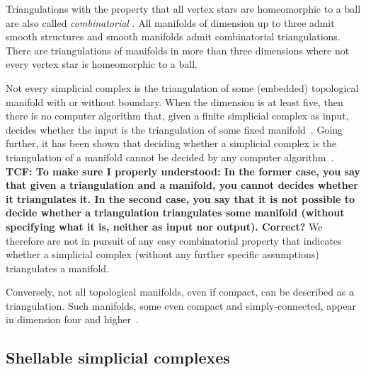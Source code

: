 \documentclass[10pt,a4paper]{article}
\newcommand{\todo}[1]{{\color{RedOrange}\textbf{#1}}}
\begin{document}
\begin{remark}
    Triangulations with the property that all vertex stars are homeomorphic to a ball are also called \emph{combinatorial} \cite[Section~1]{Bagchi2005}.
    All manifolds of dimension up to three admit smooth structures and smooth manifolds admit combinatorial triangulations. 
    There are triangulations of manifolds in more than three dimensions where not every vertex star is homeomorphic to a ball. 
    
    Not every simplicial complex is the triangulation of some (embedded) topological manifold with or without boundary. 
    When the dimension is at least five, then there is no computer algorithm that, given a finite simplicial complex as input, decides whether the input is the triangulation of some fixed manifold~\cite{chernavsky2006unrecognizability}.
    Going further, it has been shown that deciding whether a simplicial complex is the triangulation of a manifold cannot be decided by any computer algorithm~\cite{poonen2014undecidable}.     
    \todo{TCF: To make sure I properly understood: In the former case, you say that given a triangulation and a manifold, you cannot decides
    whether it triangulates it. In the second case, you say that it is not possible to decide whether a triangulation triangulates some manifold (without specifying what it is, neither as input nor output). Correct?}
    We therefore are not in pursuit of any easy combinatorial property that indicates whether a simplicial complex (without any further specific assumptions) triangulates a manifold.

    Conversely, not all topological manifolds, even if compact, can be described as a triangulation. 
    Such manifolds, some even compact and simply-connected, appear in dimension four and higher~\cite{akbulut2014casson}.
\end{remark}








\subsection{Shellable simplicial complexes}\label{subsection:shellability}
\end{document}
